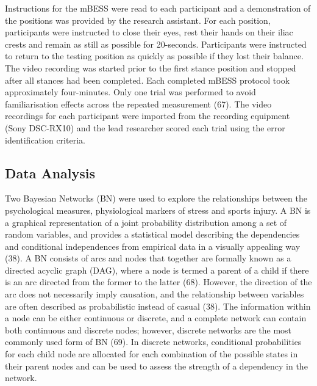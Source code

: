 \documentclass[
  english,
  man]{apa6}
\begin{document}
Instructions for the mBESS were read to each participant and a demonstration of the positions was provided by the research assistant.
For each position, participants were instructed to close their eyes, rest their hands on their iliac crests and remain as still as possible for 20-seconds.
Participants were instructed to return to the testing position as quickly as possible if they lost their balance.
The video recording was started prior to the first stance position and stopped after all stances had been completed.
Each completed mBESS protocol took approximately four-minutes.
Only one trial was performed to avoid familiarisation effects across the repeated measurement (67).
The video recordings for each participant were imported from the recording equipment (Sony DSC-RX10) and the lead researcher scored each trial using the error identification criteria.

\hypertarget{data-analysis}{%
\subsection{Data Analysis}\label{data-analysis}}

Two Bayesian Networks (BN) were used to explore the relationships between the psychological measures, physiological markers of stress and sports injury.
A BN is a graphical representation of a joint probability distribution among a set of random variables, and provides a statistical model describing the dependencies and conditional independences from empirical data in a visually appealing way (38).
A BN consists of arcs and nodes that together are formally known as a directed acyclic graph (DAG), where a node is termed a parent of a child if there is an arc directed from the former to the latter (68).
However, the direction of the arc does not necessarily imply causation, and the relationship between variables are often described as probabilistic instead of casual (38).
The information within a node can be either continuous or discrete, and a complete network can contain both continuous and discrete nodes; however, discrete networks are the most commonly used form of BN (69). In discrete networks, conditional probabilities for each child node are allocated for each combination of the possible states in their parent nodes and can be used to assess the strength of a dependency in the network.
\end{document}
